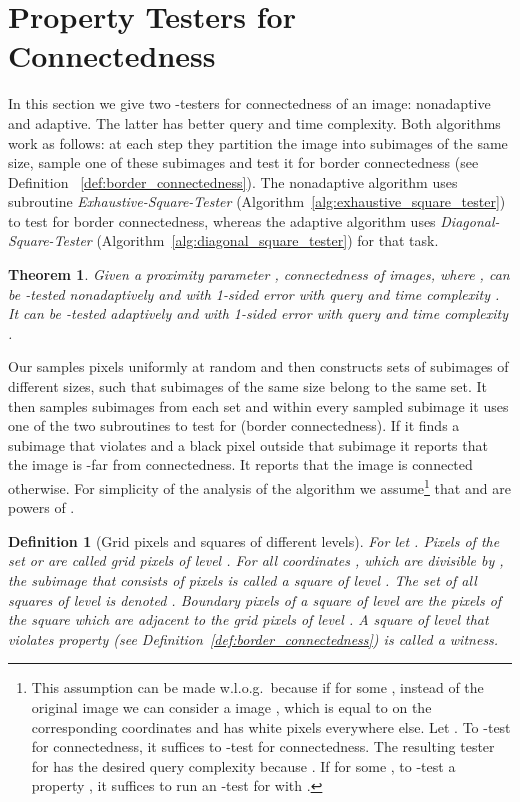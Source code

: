 \documentclass[11pt,english]{article}
\newtheorem{theorem}{Theorem}[section]
\newtheorem{definition}{Definition}[section]
\numberwithin{figure}{section}
\begin{document}
\section{Property Testers for Connectedness}\label{tester_for_connectedness}
In this section we give two -testers
for connectedness of an image: nonadaptive and adaptive. The latter has better
query and time complexity. Both algorithms work as follows: at each step they
partition the image into subimages of the same size, sample one of these
subimages and test it for  border connectedness (see Definition~
\ref{def:border_connectedness}). The nonadaptive algorithm uses subroutine \emph{Exhaustive-Square-Tester}
(Algorithm~\ref{alg:exhaustive_square_tester}) to test for border connectedness, whereas the adaptive algorithm uses \emph{Diagonal-Square-Tester} (Algorithm~\ref{alg:diagonal_square_tester}) for that task.

 \begin{theorem}\label{thm:connectedness_tester}
Given a proximity parameter , connectedness of  images, where  , can be -tested nonadaptively and with 1-sided error with query and time complexity .
It can be -tested adaptively and with 1-sided error with query and time complexity .
\end{theorem}

Our  samples pixels uniformly at random and
then constructs sets of subimages of different sizes, such that subimages of the
same size belong to the same set.
It then samples subimages from each set and within every sampled subimage
it uses one of the two subroutines to test for  (border
connectedness). If it finds a subimage that violates  and a black
pixel outside that subimage it reports that the image is -far from
connectedness. It reports that the image is connected otherwise. For simplicity
of the analysis of the algorithm we assume\footnote {This assumption can be made
w.l.o.g.\ because if  for some  , instead of the original image  we can consider a  image , which is equal to  on the corresponding coordinates and has white pixels everywhere else. Let
.
To -test  for connectedness, it suffices to -test  for connectedness.
The resulting tester for  has the desired query complexity because . If  for
some , to -test a property , it suffices to run an -test for  with  .} that  and  are powers of
.

\begin{definition}[Grid pixels and squares of different levels]
\label{def:Grid_pixels_squares_of_different_levels}
For  let .
Pixels of the set  or  are called
\emph{grid pixels of level  .} For all coordinates , which are divisible by ,
the  subimage that consists of pixels  is
called a \emph{square of level}  . The set of all squares of level   is denoted .
{\em Boundary pixels} of a square of level   are the pixels of the square which are adjacent to the grid pixels of level  . A square of level   that violates property  (see Definition~\ref{def:border_connectedness}) is called a \emph{witness}.
\end{definition}
\end{document}
